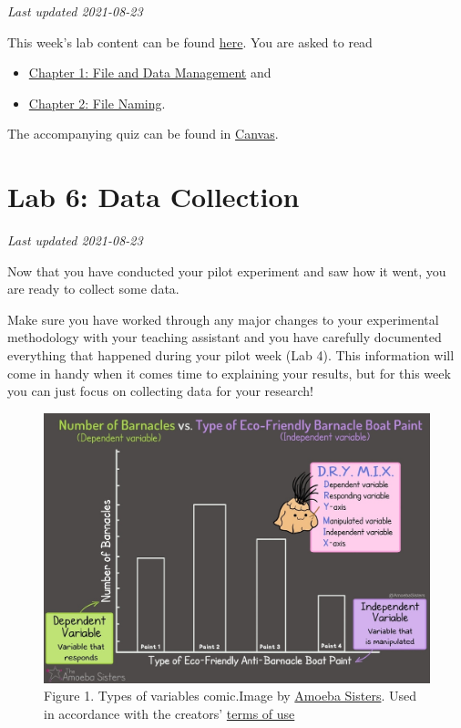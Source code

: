 \documentclass[
]{book}
\providecommand{\tightlist}{%
  \setlength{\itemsep}{0pt}\setlength{\parskip}{0pt}}
\begin{document}
\emph{Last updated 2021-08-23}

This week's lab content can be found \href{https://ubco-biology.github.io/Procedures-and-Guidelines/file-and-data-management.html}{here}. You are asked to read

\begin{itemize}
\tightlist
\item
  \href{https://ubco-biology.github.io/Procedures-and-Guidelines/file-and-data-management.html}{Chapter 1: File and Data Management} and
\item
  \href{https://ubco-biology.github.io/Procedures-and-Guidelines/file-naming.html}{Chapter 2: File Naming}.
\end{itemize}

The accompanying quiz can be found in \href{https://canvas.ubc.ca/courses/90147}{Canvas}.

\hypertarget{lab-6-data-collection}{%
\chapter*{Lab 6: Data Collection}\label{lab-6-data-collection}}

\emph{Last updated 2021-08-23}

Now that you have conducted your pilot experiment and saw how it went, you are ready to collect some data.

Make sure you have worked through any major changes to your experimental methodology with your teaching assistant and you have carefully documented everything that happened during your pilot week (Lab 4). This information will come in handy when it comes time to explaining your results, but for this week you can just focus on collecting data for your research!

\begin{figure}
\centering
\includegraphics{figures_images/Lab6-Fig1.jpg}
\caption{Figure 1. Types of variables comic.Image by \href{https://www.amoebasisters.com/parameciumparlorcomics/category/nature-of-science/2}{Amoeba Sisters}. Used in accordance with the creators' \href{https://www.amoebasisters.com/termsofuse.html}{terms of use}}
\end{figure}
\end{document}
